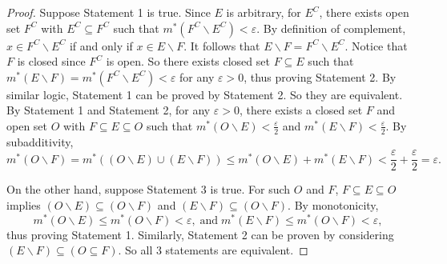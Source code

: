 \documentclass[class=book, crop=false]{standalone}
\begin{document}
    \begin{proof}
        Suppose Statement 1 is true. Since $E$ is arbitrary, for $E^C$, there exists open set $F^C$ with $E^C \subseteq F^C$ such that $m^*(F^C \backslash E^C) < \varepsilon$. By definition of complement, $x \in F^C \backslash E^C$ if and only if $x \in E \backslash F$. It follows that $E \backslash F = F^C \backslash E^C$. Notice that $F$ is closed since $F^C$ is open. So there exists closed set $F \subseteq E$ such that $m^*(E \backslash F) = m^*(F^C \backslash E^C) < \varepsilon$ for any $\varepsilon > 0$, thus proving Statement 2. By similar logic, Statement 1 can be proved by Statement 2. So they are equivalent. \\

        \noindent By Statement 1 and Statement 2, for any $\varepsilon > 0$, there exists a closed set $F$ and open set $O$ with $F \subseteq E \subseteq O$ such that $m^*(O \backslash E) < \frac{\varepsilon}{2}$ and $m^*(E \backslash F) < \frac{\varepsilon}{2}$. By subadditivity,
        \begin{equation*}
            m^*(O \backslash F) = m^*((O \backslash E) \cup (E \backslash F)) \leq m^*(O \backslash E) + m^*(E \backslash F) < \frac{\varepsilon}{2} + \frac{\varepsilon}{2} = \varepsilon.
        \end{equation*}

        \noindent On the other hand, suppose Statement 3 is true. For such $O$ and $F$, $F \subseteq E \subseteq O$ implies $(O \backslash E) \subseteq (O \backslash F)$ and $(E \backslash F) \subseteq (O \backslash F)$. By monotonicity,
        \begin{equation*}
            m^*(O \backslash E) \leq m^*(O \backslash F) < \varepsilon, \;\text{and}\; m^*(E \backslash F) \leq m^*(O \backslash F) < \varepsilon,
        \end{equation*}
        thus proving Statement 1. Similarly, Statement 2 can be proven by considering $(E \backslash F) \subseteq (O \subseteq F)$. So all $3$ statements are equivalent.
    \end{proof}
\end{document}
